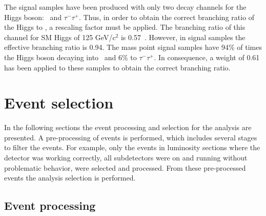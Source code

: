 The signal samples have been produced with only two decay channels for the Higgs boson: \bbbar~and $\tau^{-}\tau^{+}$. Thus, in order to obtain the correct branching ratio of the Higgs to \bbbar, a rescaling factor must be applied. The branching ratio of this channel for SM Higgs of 125 GeV/$\text{c}^{2}$ is 0.57~\cite{Heinemeyer:2013tqa}. However, in signal samples the effective branching ratio is 0.94. The mass point signal samples have 94\% of times the Higgs boson decaying into \bbbar~and 6\% to $\tau^{-}\tau^{+}$. In consequence, a weight of 0.61 has been applied to these samples to obtain the correct branching ratio. %



\section{Event selection}
\label{sec:sel}

In the following sections the event processing and selection for the analysis are presented. A pre-processing of events is performed, which includes several stages to filter the events. For example, only the events in luminosity sections where the detector was working correctly, all subdetectors were on and running without problematic behavior, were selected and processed. From these pre-processed events the analysis selection is performed.

\subsection{Event processing}

